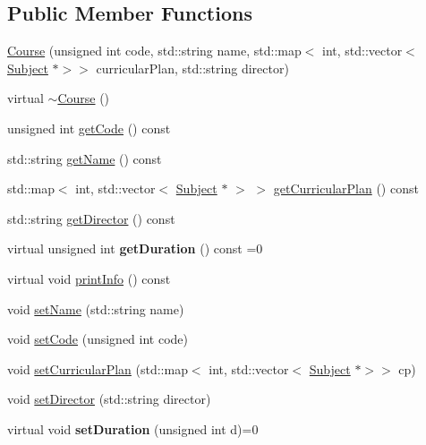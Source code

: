 \subsection*{Public Member Functions}
\begin{DoxyCompactItemize}
\item 
\hyperlink{classCourse_a0caa544c52f7d2c69640be093d40f90b}{Course} (unsigned int code, std\+::string name, std\+::map$<$ int, std\+::vector$<$ \hyperlink{classSubject}{Subject} $\ast$$>$$>$ curricular\+Plan, std\+::string director)
\item 
virtual \hyperlink{classCourse_aa9038f2e129526920037dda9e76d69d0}{$\sim$\+Course} ()
\item 
unsigned int \hyperlink{classCourse_a6203b3564734a69d94779f168ff60ab5}{get\+Code} () const
\item 
std\+::string \hyperlink{classCourse_ab26b47d93027fcecffdf42b2ee526f87}{get\+Name} () const
\item 
std\+::map$<$ int, std\+::vector$<$ \hyperlink{classSubject}{Subject} $\ast$ $>$ $>$ \hyperlink{classCourse_a169989b538567685e25dcaf164b8e625}{get\+Curricular\+Plan} () const
\item 
std\+::string \hyperlink{classCourse_a604c801567695fc34bc932695a8943a0}{get\+Director} () const
\item 
\mbox{\label{classCourse_af030e2cd407ebe7f390d554a62c0e333}} 
virtual unsigned int {\bfseries get\+Duration} () const =0
\item 
virtual void \hyperlink{classCourse_a3248ecd5df196cf50ce379ec37758c59}{print\+Info} () const
\item 
void \hyperlink{classCourse_a9bf594cc571e3cadd5d8df30c919bfa7}{set\+Name} (std\+::string name)
\item 
void \hyperlink{classCourse_a7aa38c1cf32c66b3c4307ff24d4e1f60}{set\+Code} (unsigned int code)
\item 
void \hyperlink{classCourse_a84a9fd9d25660d52a5b0f58b7d4383bc}{set\+Curricular\+Plan} (std\+::map$<$ int, std\+::vector$<$ \hyperlink{classSubject}{Subject} $\ast$$>$$>$ cp)
\item 
void \hyperlink{classCourse_a3b5489259ca31e4ffa2802dd84073b32}{set\+Director} (std\+::string director)
\item 
\mbox{\label{classCourse_a416a700f90ee60d6ebaf1a99f3672deb}} 
virtual void {\bfseries set\+Duration} (unsigned int d)=0
\item 

\end{DoxyCompactItemize}
